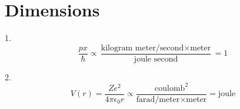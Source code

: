 

\section*{Dimensions}

1.
\begin{equation*}
\frac{px}{\hbar}\propto\frac{\text{kilogram meter/second}\times\text{meter}}
{\text{joule second}}=1
\end{equation*}

2.
\begin{equation*}
V(r)=\frac{Ze^2}{4\pi\epsilon_0r}
\propto\frac{\text{coulomb}^2}{\text{farad/meter}\times\text{meter}}=\text{joule}
\end{equation*}


